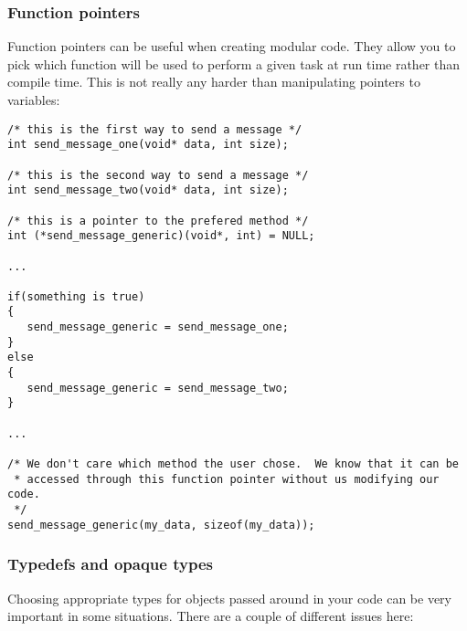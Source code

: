\documentclass[11pt, letterpaper]{article}
\begin{document}
\subsubsection{Function pointers}

Function pointers can be useful when creating modular code.  They allow
you to pick which function will be used to perform a given task at run
time rather than compile time.  This is not really any harder than
manipulating pointers to variables:

\begin{verbatim}
/* this is the first way to send a message */
int send_message_one(void* data, int size);

/* this is the second way to send a message */
int send_message_two(void* data, int size);

/* this is a pointer to the prefered method */
int (*send_message_generic)(void*, int) = NULL;

...

if(something is true)
{
   send_message_generic = send_message_one;
}
else
{
   send_message_generic = send_message_two;
}

...

/* We don't care which method the user chose.  We know that it can be
 * accessed through this function pointer without us modifying our code.
 */
send_message_generic(my_data, sizeof(my_data));
\end{verbatim}


\subsubsection{Typedefs and opaque types}

Choosing appropriate types for objects passed around in your code can be
very important in some situations.  There are a couple of different
issues here:
\end{document}
